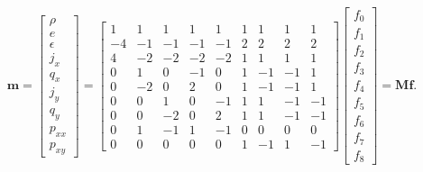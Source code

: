\documentclass[pdftex,ms]{pittetd}
\newcommand{\transM}{\mathbf{M}}
\begin{document}
\begin{equation} \label{eq:transformation-matrix}
\mathbf{m} = \begin{bmatrix}
\rho \\ e \\ \epsilon \\ j_x \\ q_x \\ j_y \\ q_y \\ p_{xx} \\ p_{xy}
\end{bmatrix} = \begin{bmatrix}
1 & 1 & 1 & 1 & 1 & 1 & 1 & 1 & 1 \\
-4 & -1 & -1 & -1 & -1 & 2 & 2 & 2 & 2 \\
4 & -2 & -2 & -2 & -2 & 1 & 1 & 1 & 1 \\
0 & 1 & 0 & -1 & 0 & 1 & -1 & -1 & 1 \\
0 & -2 & 0 & 2 & 0 & 1 & -1 & -1 & 1 \\
0 & 0 & 1 & 0 & -1 & 1 & 1 & -1 & -1 \\
0 & 0 & -2 & 0 & 2 & 1 & 1 & -1 & -1 \\
0 & 1 & -1 & 1 & -1 & 0 & 0 & 0 & 0 \\
0 & 0 & 0 & 0 & 0 & 1 & -1 & 1 & -1
\end{bmatrix} \begin{bmatrix}
f_0 \\
f_1 \\
f_2 \\
f_3 \\
f_4 \\
f_5 \\
f_6 \\
f_7 \\
f_8
\end{bmatrix} = \transM \mathbf{f}.
\end{equation}
\end{document}
